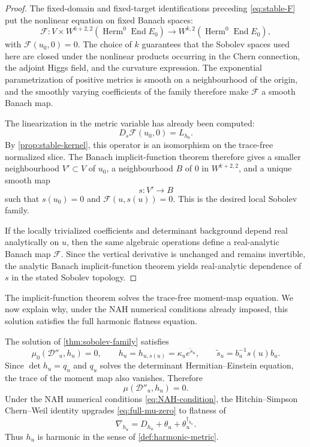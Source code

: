 \documentclass[11pt,reqno]{amsart}
\theoremstyle{definition}
\theoremstyle{remark}
\newcommand{\cD}{\mathcal D}
\newcommand{\cF}{\mathcal F}
\newcommand{\End}{\operatorname{End}}
\newcommand{\Herm}{\operatorname{Herm}}
\begin{document}
\begin{proof}
The fixed-domain and fixed-target identifications preceding \eqref{eq:stable-F} put the nonlinear equation on fixed Banach spaces:
\[
  \cF:V\times W^{k+2,2}(\Herm^0\End E_0)
  \longrightarrow W^{k,2}(\Herm^0\End E_0),
\]
with $\cF(u_0,0)=0$.  The choice of $k$ guarantees that the Sobolev spaces used here are closed under the nonlinear products occurring in the Chern connection, the adjoint Higgs field, and the curvature expression.  The exponential parametrization of positive metrics is smooth on a neighbourhood of the origin, and the smoothly varying coefficients of the family therefore make $\cF$ a smooth Banach map.

The linearization in the metric variable has already been computed:
\[
  D_s\cF(u_0,0)=L_{h_0}.
\]
By \cref{prop:stable-kernel}, this operator is an isomorphism on the trace-free normalized slice.  The Banach implicit-function theorem therefore gives a smaller neighbourhood $V'\subset V$ of $u_0$, a neighbourhood $B$ of $0$ in $W^{k+2,2}$, and a unique smooth map
\[
  s:V'\to B
\]
such that $s(u_0)=0$ and $\cF(u,s(u))=0$.  This is the desired local Sobolev family.

If the locally trivialized coefficients and determinant background depend real analytically on $u$, then the same algebraic operations define a real-analytic Banach map $\cF$.  Since the vertical derivative is unchanged and remains invertible, the analytic Banach implicit-function theorem yields real-analytic dependence of $s$ in the stated Sobolev topology.
\end{proof}


The implicit-function theorem solves the trace-free moment-map equation.  We now explain why, under the NAH numerical conditions already imposed, this solution satisfies the full harmonic flatness equation.


The solution of \cref{thm:sobolev-family} satisfies
\[
  \mu_0(\cD''_u,h_u)=0,
  \qquad
  h_u=h_{u,s(u)}=\kappa_u e^{\widetilde s_u},
  \qquad
  \widetilde s_u=b_u^{-1}s(u)b_u.
\]
Since $\det h_u=q_u$ and $q_u$ solves the determinant Hermitian--Einstein equation, the trace of the moment map also vanishes.  Therefore
\begin{equation}\label{eq:full-mu-zero}
  \mu(\cD''_u,h_u)=0.
\end{equation}
Under the NAH numerical conditions \eqref{eq:NAH-condition}, the Hitchin--Simpson Chern--Weil identity upgrades \eqref{eq:full-mu-zero} to flatness of
\[
  \nabla_{h_u}=D_{h_u}+\theta_u+\theta_u^{\dagger_{h_u}}.
\]
Thus $h_u$ is harmonic in the sense of \cref{def:harmonic-metric}.
\end{document}

